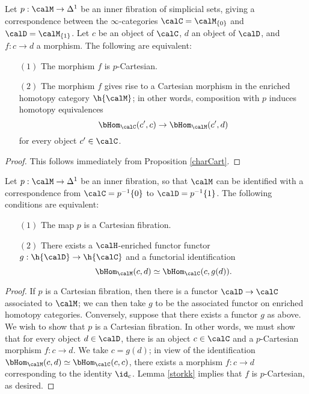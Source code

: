\begin{lemma}\label{storkk}
Let $p: \calM \rightarrow \Delta^1$ be an inner fibration of simplicial sets, giving a correspondence
between the $\infty$-categories $\calC = \calM_{ \{0\} }$ and $\calD = \calM_{ \{1\} }$. Let $c$ be an object of $\calC$, $d$ an object of $\calD$, and $f: c \rightarrow d$ a morphism. The following are equivalent:
\begin{itemize}
\item[$(1)$] The morphism $f$ is $p$-Cartesian.
\item[$(2)$] The morphism $f$ gives rise to a Cartesian morphism in the enriched homotopy category $\h{\calM}$; in other words, composition with $p$ induces homotopy equivalences
$$ \bHom_{\calC }(c',c) \rightarrow \bHom_{\calM}(c',d)$$ for every
object $c' \in \calC$.
\end{itemize}
\end{lemma}

\begin{proof}
This follows immediately from Proposition \ref{charCart}.
\end{proof}

\begin{lemma}\label{storkkkk}
Let $p: \calM \rightarrow \Delta^1$ be an inner fibration, so that $\calM$ can be identified with a correspondence from $\calC = p^{-1} \{0\}$ to $\calD = p^{-1} \{1\}$. The following conditions are equivalent:
\begin{itemize}
\item[$(1)$] The map $p$ is a Cartesian fibration.
\item[$(2)$] There exists a $\calH$-enriched functor functor $g: \h{ \calD} \rightarrow \h{\calC}$ and a functorial identification $$\bHom_{\calM}(c,d) \simeq \bHom_{\calC}(c,g(d)).$$
\end{itemize}
\end{lemma}

\begin{proof}
If $p$ is a Cartesian fibration, then there is a functor $\calD \rightarrow \calC$ associated to $\calM$; we can then take $g$ to be the associated functor on enriched homotopy categories. Conversely, suppose that there exists a functor $g$ as above. We wish to show that $p$ is a Cartesian fibration. In other words, we must show that for every object $d \in \calD$, there is an object $c \in \calC$
and a $p$-Cartesian morphism $f: c \rightarrow d$. We take $c=g(d)$; in view of the identification
$\bHom_{\calM}(c,d) \simeq \bHom_{\calC}(c,c)$, there exists a morphism $f: c \rightarrow d$ corresponding to the identity $\id_{c}$. Lemma \ref{storkk} implies that $f$ is $p$-Cartesian, as desired.
\end{proof}

